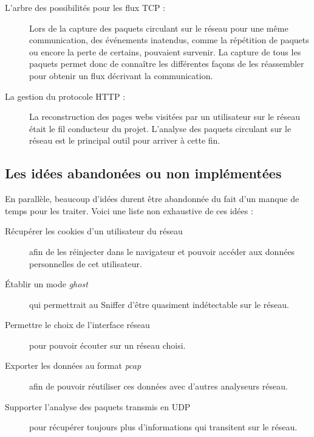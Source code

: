 \begin{description}
\item[L'arbre des possibilités pour les flux TCP :] Lors de la capture des paquets circulant sur le réseau pour une même communication, des événements inatendus, comme la répétition de paquets ou encore la perte de certains,  pouvaient survenir. La capture de tous les paquets permet donc de connaître les différentes façons de les réassembler pour obtenir un flux décrivant la communication. 
\item[La gestion du protocole HTTP :] La reconstruction des pages webs visitées par un utilisateur sur le réseau était le fil conducteur du projet. L'analyse des paquets circulant sur le réseau est le principal outil pour arriver à cette fin.\\
\end{description}

\subsection{Les idées abandonées ou non implémentées}
En parallèle, beaucoup d'idées durent être abandonnée du fait d'un manque de temps pour les traiter. Voici une liste non exhaustive de ces idées :
\begin{description}
  \item[Récupérer les cookies d'un utilisateur du réseau] afin de les réinjecter dans le navigateur et pouvoir accéder aux données personnelles de cet utilisateur.
  \item[Établir un mode \emph{ghost}] qui permettrait au Sniffer d'être quasiment indétectable sur le réseau. 
  \item[Permettre le choix de l'interface réseau] pour pouvoir écouter sur un réseau choisi.  
  \item[Exporter les données au format \emph{pcap}] afin de pouvoir réutiliser ces données avec d'autres analyseurs réseau.
  \item[Supporter l'analyse des paquets transmis en UDP] pour récupérer toujours plus d'informations qui transitent sur le réseau.
\end{description}
